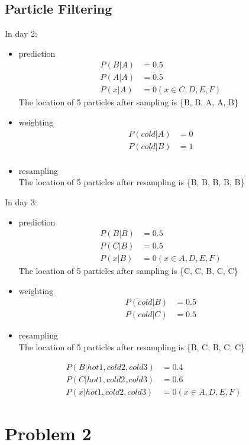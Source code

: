 \documentclass[12pt]{amsart}
\begin{document}
\subsection*{Particle Filtering}
In day 2:
\begin{itemize}
\item prediction
\begin{align*}
P(B|A) &= 0.5 \\
P(A|A) &= 0.5 \\
P(x|A) &= 0 (x \in {C, D, E, F})
\end{align*}
The location of 5 particles after sampling is \{B, B, A, A, B\}
\item weighting 
\begin{align*}
P(cold | A) &= 0 \\
P(cold | B) &= 1 \\
\end {align*}
\item resampling \\
The location of 5 particles after resampling is \{B, B, B, B, B\}
\end{itemize} 
In day 3:
\begin{itemize}
\item prediction
\begin{align*}
P(B|B) &= 0.5 \\
P(C|B) &= 0.5 \\
P(x|B) &= 0 (x \in {A, D, E, F})
\end{align*} 
The location of 5 particles after sampling is \{C, C, B, C, C\}
\item weighting  
\begin{align*}
P(cold | B) &= 0.5\\
P(cold | C) &= 0.5
\end{align*}
\item resampling \\
The location of 5 particles after resampling is \{B, C, B, C, C\}
\end{itemize} 
\begin{align*}
P(B | hot 1 , cold 2 , cold 3 ) &= 0.4 \\ 
P(C | hot 1 , cold 2 , cold 3 ) &= 0.6 \\
P(x | hot 1 , cold 2 , cold 3 ) &= 0 (x \in {A, D, E, F})
\end {align*}


\section*{Problem 2}
\end{document}
